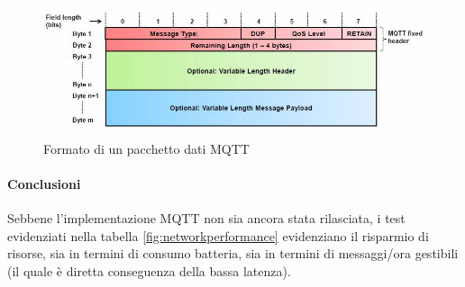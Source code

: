 \documentclass[a4paper,10pt]{memoir}
\begin{document}
\begin{figure}[ht]
\centering
\caption{Formato di un pacchetto dati MQTT}
\label{fig:mqttpacket}
\includegraphics[width=\textwidth]{app/MQTT}
\end{figure}

\paragraph{Conclusioni} Sebbene l'implementazione MQTT non sia ancora stata rilasciata, i test evidenziati nella tabella \ref{fig:networkperformance} evidenziano il risparmio di risorse, sia in termini di consumo batteria, sia in termini di messaggi/ora gestibili (il quale è diretta conseguenza della bassa latenza).

\pagebreak
\end{document}

